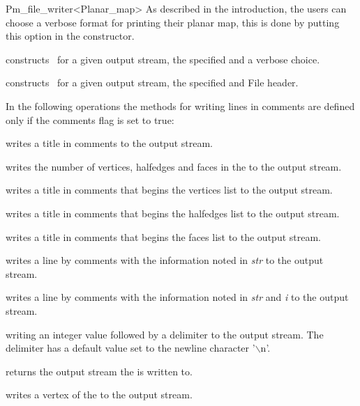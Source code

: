 \begin{ccRefClass}{Pm_file_writer<Planar_map>}
\ccCreation
As described in the introduction, the  users can choose a verbose format for 
printing their planar map, this is done by putting this option in the constructor.

{constructs \ccRefName\ for a given output stream, the specified  and a verbose choice.}

{constructs \ccRefName\ for a given output stream, the specified  and {File header}.}

\ccOperations

In the following operations the methods for writing lines in 
comments are defined only if the comments flag is set to true:

{writes a title in comments to the output stream.}

{writes the number of vertices, halfedges and faces in the  to the output stream.}

{writes a title in comments that begins the vertices list to the output stream.}

{writes a title in comments that begins the halfedges list to the output stream.}

{writes a title in comments that begins the faces list to the output stream.}

{writes a line by comments with the information noted in {\em str} to the output stream.}

{writes a line by comments with the information noted in {\em str} and {\em i} to the output stream.}

{writing an integer value followed by a delimiter to the output stream.
 The delimiter has a default value set to the newline character 
 '$\backslash$n'.}

{returns the output stream the  is written to.} 

{writes a vertex of the  to the output stream.}


\end{ccRefClass}
